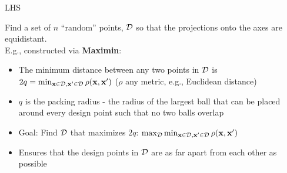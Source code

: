 \documentclass[11pt,compress,t,notes=noshow, xcolor=table]{beamer}
\begin{document}
\begin{frame}{LHS}

Find a set of $n$ \enquote{random} points, $\mathcal{D}$ so that the projections onto the axes are equidistant.\\
E.g., constructed via \textbf{Maximin}:\\
\begin{itemize}
\item The minimum distance between any two points in $\mathcal{D}$ is $2q = \min_{\mathbf{x} \in \mathcal{D}, \mathbf{x}' \in \mathcal{D}} \rho(\mathbf{x}, \mathbf{x}')$ ($\rho$ any metric, e.g., Euclidean distance)
\item $q$ is the packing radius - the radius of the largest ball that can be placed around every design point such that no two balls overlap
\item Goal: Find $\mathcal{D}$ that maximizes $2q$: $\max_{\mathcal{D}} \min_{\mathbf{x} \in \mathcal{D}, \mathbf{x}' \in \mathcal{D}} \rho(\mathbf{x}, \mathbf{x}')$
\item Ensures that the design points in $\mathcal{D}$ are as far apart from each other as possible
\end{itemize}

\end{frame}
\end{document}
